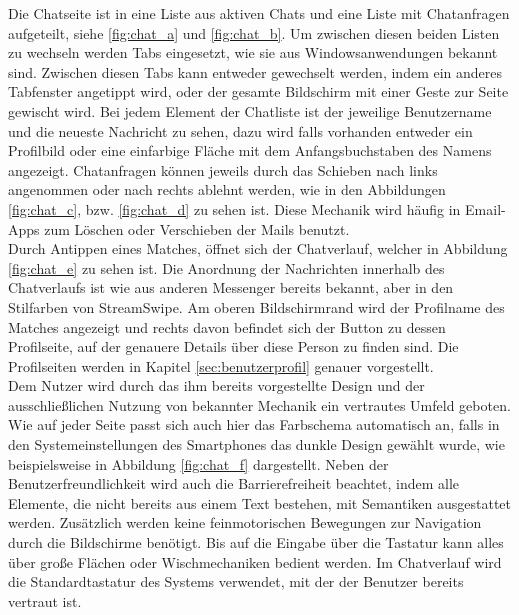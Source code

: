 Die Chatseite ist in eine Liste aus aktiven Chats und eine Liste mit Chatanfragen aufgeteilt, siehe \ref{fig:chat_a} und \ref{fig:chat_b}. Um zwischen diesen beiden Listen zu wechseln werden Tabs eingesetzt, wie sie aus Windowsanwendungen bekannt sind. Zwischen diesen Tabs kann entweder gewechselt werden, indem ein anderes Tabfenster angetippt wird, oder der gesamte Bildschirm mit einer Geste zur Seite gewischt wird. Bei jedem Element der Chatliste ist der jeweilige Benutzername und die neueste Nachricht zu sehen, dazu wird falls vorhanden entweder ein Profilbild oder eine einfarbige Fläche mit dem Anfangsbuchstaben des Namens angezeigt. Chatanfragen können jeweils durch das Schieben nach links angenommen oder nach rechts ablehnt werden, wie in den Abbildungen \ref{fig:chat_c}, bzw. \ref{fig:chat_d} zu sehen ist. Diese Mechanik wird häufig in Email-Apps zum Löschen oder Verschieben der Mails benutzt.\\ 
Durch Antippen eines Matches, öffnet sich der Chatverlauf, welcher in Abbildung \ref{fig:chat_e} zu sehen ist. Die Anordnung der Nachrichten innerhalb des Chatverlaufs ist wie aus anderen Messenger bereits bekannt, aber in den Stilfarben von StreamSwipe. Am oberen Bildschirmrand wird der Profilname des Matches angezeigt und rechts davon befindet sich der Button zu dessen Profilseite, auf der genauere Details über diese Person zu finden sind. Die Profilseiten werden in Kapitel \ref{sec:benutzerprofil} genauer vorgestellt. \\
Dem Nutzer wird durch das ihm bereits vorgestellte Design und der ausschließlichen Nutzung von bekannter Mechanik ein vertrautes Umfeld geboten. Wie auf jeder Seite passt sich auch hier das Farbschema automatisch an, falls in den Systemeinstellungen des Smartphones das dunkle Design gewählt wurde, wie beispielsweise in Abbildung \ref{fig:chat_f} dargestellt. Neben der Benutzerfreundlichkeit wird auch die Barrierefreiheit beachtet, indem alle Elemente, die nicht bereits aus einem Text bestehen, mit Semantiken ausgestattet werden. Zusätzlich werden keine feinmotorischen Bewegungen zur Navigation durch die Bildschirme benötigt. Bis auf die Eingabe über die Tastatur kann alles über große Flächen oder Wischmechaniken bedient werden. Im Chatverlauf wird die Standardtastatur des Systems verwendet, mit der der Benutzer bereits vertraut ist. 


